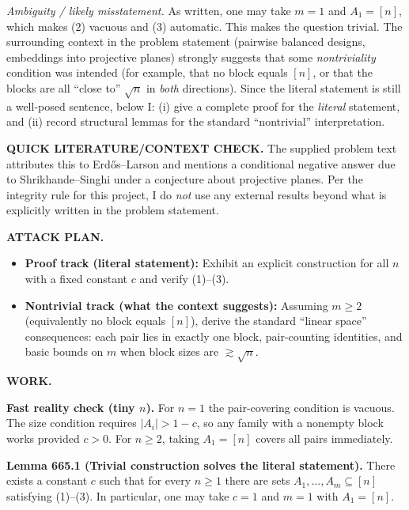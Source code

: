 \medskip
\noindent\emph{Ambiguity / likely misstatement.}
As written, one may take $m=1$ and $A_1=[n]$, which makes (2) vacuous and (3) automatic. This makes the question trivial.
The surrounding context in the problem statement (pairwise balanced designs, embeddings into projective planes) strongly suggests that some \emph{nontriviality} condition was intended (for example, that no block equals $[n]$, or that the blocks are all ``close to'' $\sqrt n$ in \emph{both} directions). Since the literal statement is still a well-posed sentence, below I:
(i) give a complete proof for the \emph{literal} statement, and
(ii) record structural lemmas for the standard ``nontrivial'' interpretation.

\bigskip
\noindent\textbf{QUICK LITERATURE/CONTEXT CHECK.}
The supplied problem text attributes this to Erd\H{o}s--Larson and mentions a conditional negative answer due to Shrikhande--Singhi under a conjecture about projective planes.
Per the integrity rule for this project, I do \emph{not} use any external results beyond what is explicitly written in the problem statement.

\bigskip
\noindent\textbf{ATTACK PLAN.}
\begin{itemize}
\item \textbf{Proof track (literal statement):} Exhibit an explicit construction for all $n$ with a fixed constant $c$ and verify (1)--(3).
\item \textbf{Nontrivial track (what the context suggests):} Assuming $m\ge 2$ (equivalently no block equals $[n]$), derive the standard ``linear space'' consequences: each pair lies in exactly one block, pair-counting identities, and basic bounds on $m$ when block sizes are $\gtrsim \sqrt n$.
\end{itemize}

\bigskip
\noindent\textbf{WORK.}

\medskip
\noindent\textbf{Fast reality check (tiny $n$).}
For $n=1$ the pair-covering condition is vacuous. The size condition requires $|A_i|>1-c$, so any family with a nonempty block works provided $c>0$.
For $n\ge 2$, taking $A_1=[n]$ covers all pairs immediately.

\medskip
\noindent\textbf{Lemma 665.1 (Trivial construction solves the literal statement).}
There exists a constant $c$ such that for every $n\ge 1$ there are sets $A_1,\dots,A_m\subseteq [n]$ satisfying (1)--(3).
In particular, one may take $c=1$ and $m=1$ with $A_1=[n]$.

